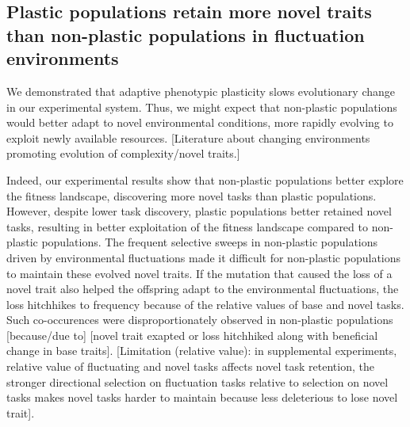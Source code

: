 \subsection{Plastic populations retain more novel traits than non-plastic populations in fluctuation environments}

We demonstrated that adaptive phenotypic plasticity slows evolutionary change in our experimental system. 
Thus, we might expect that non-plastic populations would better adapt to novel environmental conditions, more rapidly evolving to exploit newly available resources.
[Literature about changing environments promoting evolution of complexity/novel traits.]

Indeed, our experimental results show that non-plastic populations better explore the fitness landscape, discovering more novel tasks than plastic populations.
However, despite lower task discovery, plastic populations better retained novel tasks, resulting in better exploitation of the fitness landscape compared to non-plastic populations.
The frequent selective sweeps in non-plastic populations driven by environmental fluctuations made it difficult for non-plastic populations to maintain these evolved novel traits.
If the mutation that caused the loss of a novel trait also helped the offspring adapt to the environmental fluctuations, the loss hitchhikes to frequency because of the relative values of base and novel tasks.
Such co-occurences were disproportionately observed in non-plastic populations [because/due to] [novel trait exapted or loss hitchhiked along with beneficial change in base traits].
[Limitation (relative value): in supplemental experiments, relative value of fluctuating and novel tasks affects novel task retention, the stronger directional selection on fluctuation tasks relative to selection on novel tasks makes novel tasks harder to maintain because less deleterious to lose novel trait].



